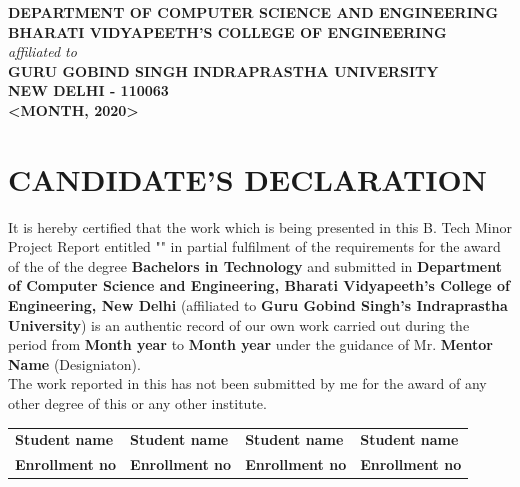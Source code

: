 \documentclass[12pt, oneside]{book}                            %
\begin{document}
\begin{titlepage}
\begin{center}
{            \textbf{
                DEPARTMENT OF COMPUTER SCIENCE AND ENGINEERING\\[.5cm]
                BHARATI VIDYAPEETH'S COLLEGE OF ENGINEERING\\[.5cm]
            }
            \textit{affiliated to}\\[.5cm]
            \textbf{
                GURU GOBIND SINGH INDRAPRASTHA UNIVERSITY\\[.5cm]
                NEW DELHI - 110063\\[1cm]
                <MONTH, 2020>
            }
        }

    \end{center}

\end{titlepage}


\frontmatter

\chapter*{\centering \textbf{\Large CANDIDATE'S DECLARATION}}
\justify

     It is hereby certified that the work which is being presented in this B. Tech Minor Project Report entitled "\textbf{\thetitle}" in partial fulfilment of the requirements for the award of the of the degree \textbf{Bachelors in Technology} and submitted in \textbf{Department of Computer Science and Engineering, Bharati Vidyapeeth’s College of Engineering, New Delhi} (affiliated to \textbf{Guru Gobind Singh’s Indraprastha University}) is an authentic record of our own work carried out during the period from \textbf{Month year} to \textbf{Month year} under the guidance of Mr. \textbf{Mentor Name} (Designiaton).\\[.5cm]

     The work reported in this has not been submitted by me for the award of any other degree of this or any other institute.\\[1.5cm]
    
    \noindent
    \begin{tabularx}{\textwidth}{X X X X}
        \textbf{\small Student name} & \textbf{\small Student name} & \textbf{\small Student name} & \textbf{\small Student name} \\
        \textbf{\small Enrollment no} & \textbf{\small Enrollment no} & \textbf{\small Enrollment no} & \textbf{\small Enrollment no}
    \end{tabularx}\\[1cm]
    
\end{document}
